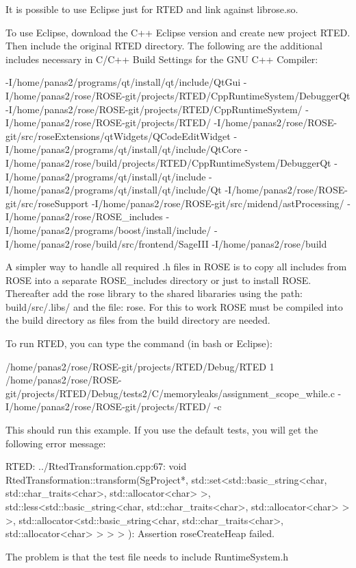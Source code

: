 It is possible to use Eclipse just for RTED and link against librose.so.

To use Eclipse, download the C++ Eclipse version and create new project RTED.
Then include the original RTED directory. The following are the additional includes necessary in C/C++ Build Settings for the GNU C++ Compiler:

-I/home/panas2/programs/qt/install/qt/include/QtGui -I/home/panas2/rose/ROSE-git/projects/RTED/CppRuntimeSystem/DebuggerQt -I/home/panas2/rose/ROSE-git/projects/RTED/CppRuntimeSystem/ -I/home/panas2/rose/ROSE-git/projects/RTED/ -I/home/panas2/rose/ROSE-git/src/roseExtensions/qtWidgets/QCodeEditWidget -I/home/panas2/programs/qt/install/qt/include/QtCore -I/home/panas2/rose/build/projects/RTED/CppRuntimeSystem/DebuggerQt -I/home/panas2/programs/qt/install/qt/include -I/home/panas2/programs/qt/install/qt/include/Qt -I/home/panas2/rose/ROSE-git/src/roseSupport -I/home/panas2/rose/ROSE-git/src/midend/astProcessing/ -I/home/panas2/rose/ROSE\_includes -I/home/panas2/programs/boost/install/include/ -I/home/panas2/rose/build/src/frontend/SageIII -I/home/panas2/rose/build 

A simpler way to handle all required .h files in ROSE is to copy all includes from ROSE into a separate ROSE\_includes directory or just to install ROSE.
Thereafter add the rose library to the shared libararies using the path: build/src/.libs/ and the file: rose.
For this to work ROSE must be compiled into the build directory as files from the build directory are needed.

To run RTED, you can type the command (in bash or Eclipse):

  /home/panas2/rose/ROSE-git/projects/RTED/Debug/RTED 1  /home/panas2/rose/ROSE-git/projects/RTED/Debug/tests2/C/memoryleaks/assignment\_scope\_while.c  -I/home/panas2/rose/ROSE-git/projects/RTED/ -c

This should run this example. If you use the default tests, you will get the following error message: 

  RTED: ../RtedTransformation.cpp:67: void RtedTransformation::transform(SgProject*,
  std::set<std::basic\_string<char, std::char\_traits<char>, std::allocator<char> >, 
  std::less<std::basic\_string<char, std::char\_traits<char>, std::allocator<char> > >, 
  std::allocator<std::basic\_string<char, std::char\_traits<char>, std::allocator<char> > 
  > > ): Assertion roseCreateHeap failed.

The problem is that the test file needs to include RuntimeSystem.h

